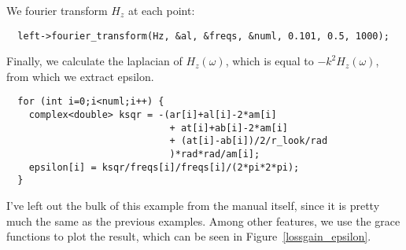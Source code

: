 We fourier transform $H_z$ at each point:

\begin{verbatim}
  left->fourier_transform(Hz, &al, &freqs, &numl, 0.101, 0.5, 1000);
\end{verbatim}
\begin{comment}
  delete[] freqs;
  printf("Working on middle fourier transform...\n");
  middle->fourier_transform(Hz, &am, &freqs, &numr, 0.101, 0.5, 1000);
  delete[] freqs;
  printf("Working on top fourier transform...\n");
  top->fourier_transform(Hz, &at, &freqs, &numr, 0.101, 0.5, 1000);
  delete[] freqs;
  printf("Working on bottom fourier transform...\n");
  bottom->fourier_transform(Hz, &ab, &freqs, &numr, 0.101, 0.5, 1000);
  delete[] freqs;
  printf("Working on right fourier transform...\n");
  right->fourier_transform(Hz, &ar, &freqs, &numr, 0.101, 0.5, 1000);
  if (numl != numr) printf("Aaack you need both nums to be the same!\n");
  g.new_set();
  g.set_legend("\\x\\e\\s1\\N");
  complex<double> *epsilon = new complex<double>[numl];
\end{comment}

Finally, we calculate the laplacian of $H_z(\omega)$, which is equal to
$-k^2 H_z(\omega)$, from which we extract epsilon.

\begin{verbatim}
  for (int i=0;i<numl;i++) {
    complex<double> ksqr = -(ar[i]+al[i]-2*am[i]
                             + at[i]+ab[i]-2*am[i]
                             + (at[i]-ab[i])/2/r_look/rad
                             )*rad*rad/am[i];
    epsilon[i] = ksqr/freqs[i]/freqs[i]/(2*pi*2*pi);
  }
\end{verbatim}

I've left out the bulk of this example from the manual itself, since it
is pretty much the same as the previous examples.  Among other features, we
use the grace functions to plot the result, which can be seen in
Figure~\ref{lossgain_epsilon}.

\begin{comment}
  for (int i=0;i<numl;i++) {
    g.output_point(real(freqs[i]), real(epsilon[i]));
  }
  g.new_set();
  g.set_legend("\\x\\e\\s2\\N");
  for (int i=0;i<numl;i++) {
    g.output_point(real(freqs[i]), imag(epsilon[i]));
  }
}
\end{comment}
